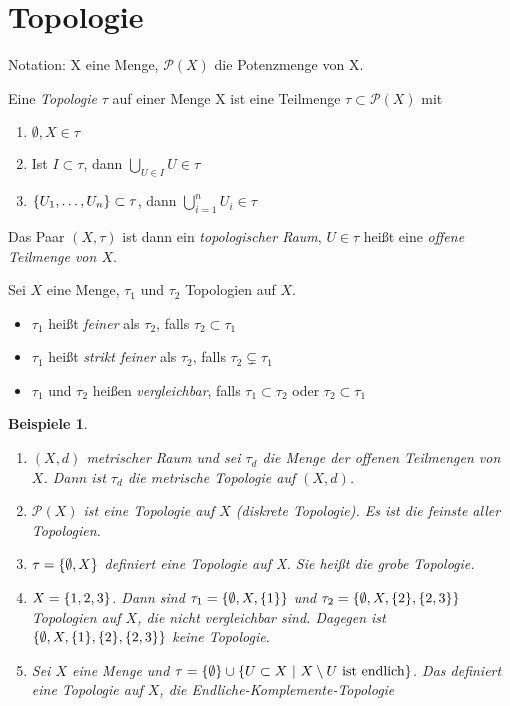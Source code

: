 \section{Topologie}

Notation: X eine Menge, $\mathcal{P}(X)$ die Potenzmenge von X.

\begin{dfn}
    Eine \emph{Topologie} $\tau$ auf einer Menge X ist eine Teilmenge
    $\tau\subset\mathcal{P}(X)$ mit
    \begin{enumerate}
        \item $\emptyset, X \in \tau$
        \item Ist $I\subset \tau$, dann $\bigcup_{U\in I} U \in\tau$
        \item $\mdef{U_1, \ldots, U_n} \subset \tau$, dann
            $\bigcup_{i=1}^n U_i \in \tau$
    \end{enumerate}
    Das Paar $(X, \tau)$ ist dann ein \emph{topologischer Raum}, $U\in\tau$ heißt
    eine \emph{offene Teilmenge von $X$}.
\end{dfn}

\begin{dfn}
    Sei $X$ eine Menge, $\tau_1$ und $\tau_2$ Topologien auf $X$.
    \begin{itemize}
        \item $\tau_1$ heißt \emph{feiner} als $\tau_2$, falls $\tau_2\subset\tau_1$
        \item $\tau_1$ heißt \emph{strikt feiner} als $\tau_2$, falls
            $\tau_2\subsetneq\tau_1$
        \item $\tau_1$ und $\tau_2$ heißen \emph{vergleichbar}, falls
            $\tau_1\subset\tau_2$ oder $\tau_2\subset\tau_1$
    \end{itemize}
\end{dfn}

\newtheorem{bsps}[dfn]{Beispiele}
\begin{bsps}
    \begin{enumerate}
        \item $(X,d)$ metrischer Raum und sei $\tau_d$ die Menge der offenen
            Teilmengen von $X$. Dann ist $\tau_d$ die \emph{metrische Topologie}
            auf $(X,d)$.
        \item $\mathcal{P}(X)$ ist eine Topologie auf $X$ (diskrete Topologie). Es
            ist die feinste aller Topologien.
        \item $\tau = \mdef{\emptyset, X}$ definiert eine Topologie auf X. Sie
            heißt die \emph{grobe Topologie}.
        \item $X=\mdef{1,2,3}$. Dann sind $\tau_1=\mdef{\emptyset,X,\mdef{1}}$ und
            $\tau_2=\mdef{\emptyset, X, \mdef{2}, \mdef{2,3}}$ Topologien auf $X$,
            die nicht vergleichbar sind. Dagegen ist
            $\mdef{\emptyset, X, \mdef{1}, \mdef{2}, \mdef{2,3}}$ keine Topologie.
        \item Sei $X$ eine Menge und
            $\tau = \mdef{\emptyset}\cup\mdef[U\subset X]{X\setminus U \ \text{ist endlich}}$.
            Das definiert eine Topologie auf $X$, die \emph{Endliche-Komplemente-Topologie}
    \end{enumerate}
\end{bsps}

